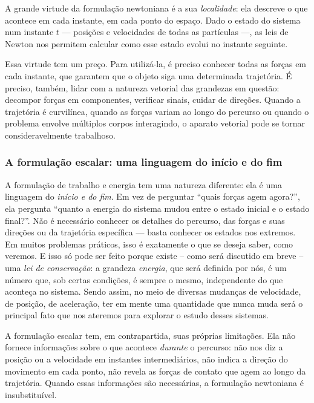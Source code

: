 A grande virtude da formulação newtoniana é a sua \textit{localidade}: ela descreve
o que acontece em cada instante, em cada ponto do espaço. Dado o estado do sistema
num instante $t$ --- posições e velocidades de todas as partículas ---, as leis de
Newton nos permitem calcular como esse estado evolui no instante seguinte. 
 
Essa virtude tem um preço. Para utilizá-la, é preciso conhecer todas as forças em
cada instante, que garantem que o objeto siga uma determinada trajetória. É preciso,
também, lidar com a natureza vetorial das grandezas em questão: decompor forças em
componentes, verificar sinais, cuidar de direções. Quando a trajetória é curvilínea,
quando as forças variam ao longo do percurso ou quando o problema envolve múltiplos
corpos interagindo, o aparato vetorial pode se tornar consideravelmente trabalhoso.
 
\subsubsection*{A formulação escalar: uma linguagem do início e do fim}
 
A formulação de trabalho e energia tem uma natureza diferente: ela é uma linguagem
do \textit{início e do fim}. Em vez de perguntar ``quais forças agem agora?'', ela
pergunta ``quanto a energia do sistema mudou entre o estado inicial e o estado
final?''. Não é necessário conhecer os detalhes do percurso, das forças e suas direções ou
da trajetória específica --- basta conhecer os estados nos extremos. Em muitos
problemas práticos, isso é exatamente o que se deseja saber, como veremos. E isso só pode ser feito porque existe -- como será discutido em breve -- uma \emph{lei de conservação}: a grandeza \emph{energia}, que será definida por nós, é um número que, sob certas condições, é sempre o mesmo, independente do que aconteça no sistema. Sendo assim, no meio de diversas mudanças de velocidade, de posição, de aceleração, ter em mente uma quantidade que nunca muda será o principal fato que nos ateremos para explorar o estudo desses sistemas.
 
A formulação escalar tem, em contrapartida, suas próprias limitações. Ela não fornece
informações sobre o que acontece \textit{durante} o percurso: não nos diz a posição
ou a velocidade em instantes intermediários, não indica a direção do movimento em
cada ponto, não revela as forças de contato que agem ao longo da trajetória. Quando
essas informações são necessárias, a formulação newtoniana é insubstituível.
 
